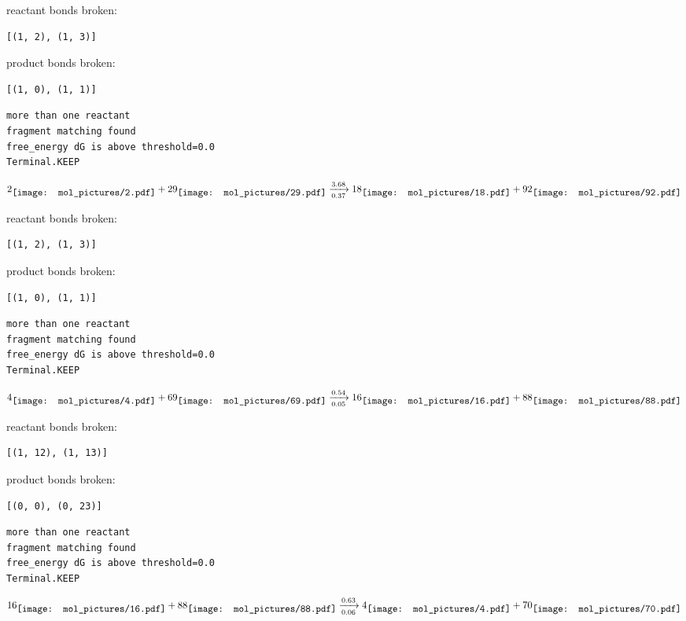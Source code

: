 \documentclass{article}
\begin{document}
reactant bonds broken:\begin{verbatim}
[(1, 2), (1, 3)]
\end{verbatim}
product bonds broken:\begin{verbatim}
[(1, 0), (1, 1)]
\end{verbatim}




\vspace{1cm}
\begin{verbatim}
more than one reactant
fragment matching found
free_energy dG is above threshold=0.0
Terminal.KEEP
\end{verbatim}
$$
2
\raisebox{-.5\height}{\texttt{[image: mol\_pictures/2.pdf]}}
+
29
\raisebox{-.5\height}{\texttt{[image: mol\_pictures/29.pdf]}}
\xrightarrow[0.37]{3.68}
18
\raisebox{-.5\height}{\texttt{[image: mol\_pictures/18.pdf]}}
+
92
\raisebox{-.5\height}{\texttt{[image: mol\_pictures/92.pdf]}}
$$


reactant bonds broken:\begin{verbatim}
[(1, 2), (1, 3)]
\end{verbatim}
product bonds broken:\begin{verbatim}
[(1, 0), (1, 1)]
\end{verbatim}




\vspace{1cm}
\begin{verbatim}
more than one reactant
fragment matching found
free_energy dG is above threshold=0.0
Terminal.KEEP
\end{verbatim}
$$
4
\raisebox{-.5\height}{\texttt{[image: mol\_pictures/4.pdf]}}
+
69
\raisebox{-.5\height}{\texttt{[image: mol\_pictures/69.pdf]}}
\xrightarrow[0.05]{0.54}
16
\raisebox{-.5\height}{\texttt{[image: mol\_pictures/16.pdf]}}
+
88
\raisebox{-.5\height}{\texttt{[image: mol\_pictures/88.pdf]}}
$$


reactant bonds broken:\begin{verbatim}
[(1, 12), (1, 13)]
\end{verbatim}
product bonds broken:\begin{verbatim}
[(0, 0), (0, 23)]
\end{verbatim}




\vspace{1cm}
\begin{verbatim}
more than one reactant
fragment matching found
free_energy dG is above threshold=0.0
Terminal.KEEP
\end{verbatim}
$$
16
\raisebox{-.5\height}{\texttt{[image: mol\_pictures/16.pdf]}}
+
88
\raisebox{-.5\height}{\texttt{[image: mol\_pictures/88.pdf]}}
\xrightarrow[0.06]{0.63}
4
\raisebox{-.5\height}{\texttt{[image: mol\_pictures/4.pdf]}}
+
70
\raisebox{-.5\height}{\texttt{[image: mol\_pictures/70.pdf]}}
$$
\end{document}
